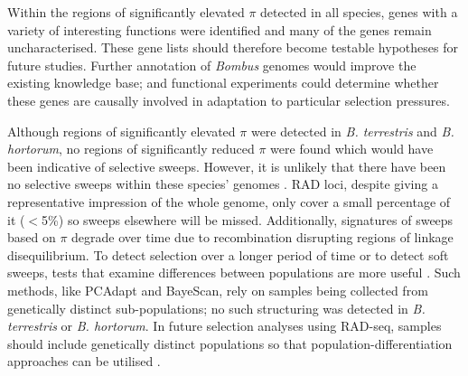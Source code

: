 \documentclass[12pt]{article}
\begin{document}
\begin{linenumbers}

	Within the regions of significantly elevated $\pi$ detected in all species, genes with a variety of interesting functions were identified and many of the genes remain uncharacterised. These gene lists should therefore become testable hypotheses for future studies. Further annotation of \emph{Bombus} genomes would improve the existing knowledge base; and functional experiments could determine whether these genes are causally involved in adaptation to particular selection pressures. 
		

	Although regions of significantly elevated $\pi$ were detected in \emph{B. terrestris} and \emph{B. hortorum}, no regions of significantly reduced $\pi$ were found which would have been indicative of selective sweeps. However, it is unlikely that there have been no selective sweeps within these species' genomes \citep{colgan_genomic_2022}. RAD loci, despite giving a representative impression of the whole genome, only cover a small percentage of it ($<$5\%) so sweeps elsewhere will be missed. Additionally, signatures of sweeps based on $\pi$ degrade over time due to recombination disrupting regions of linkage disequilibrium. To detect selection over a longer period of time or to detect soft sweeps, tests that examine differences between populations are more useful \citep{hohenlohe_using_2010}. Such methods, like PCAdapt and BayeScan, rely on samples being collected from genetically distinct sub-populations; no such structuring was detected in \emph{B. terrestris} or \emph{B. hortorum}. 
	In future selection analyses using RAD-seq, samples should include genetically distinct populations so that population-differentiation approaches can be utilised \citep{davey_radseq_2010, hohenlohe_population_2012}.

    	

\end{linenumbers}
\end{document}
